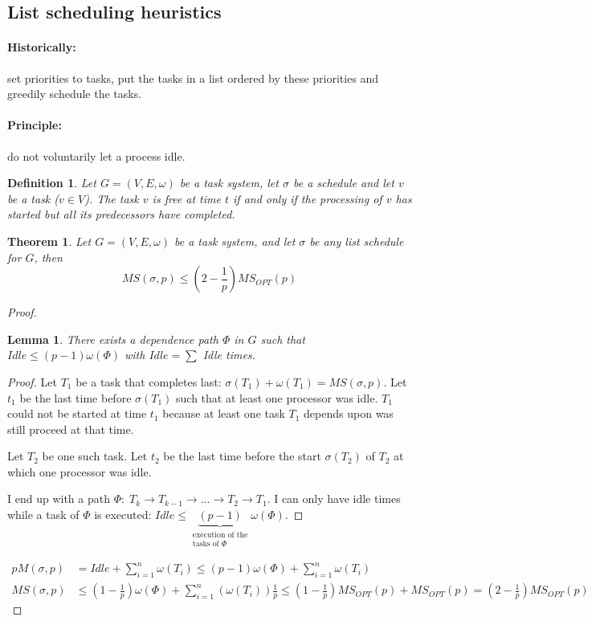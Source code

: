 \documentclass{article}
\newtheorem{thm}{Theorem}
\newtheorem{lemma}{Lemma}
\newtheorem{defi}{Definition}
\begin{document}
\subsection{List scheduling heuristics}
\paragraph{Historically:} set priorities to tasks, put the tasks in a list ordered by these priorities and greedily schedule the tasks.

\paragraph{Principle:} do not voluntarily let a process idle.

\begin{defi}
Let $G=(V,E,\omega)$ be a task system, let $\sigma$ be a schedule and let $v$ be a task ($v\in V$). The task $v$ is free at time $t$ if and only if the processing of $v$ has started but all its predecessors have completed.
\end{defi}

\begin{thm}
Let $G=(V,E,\omega)$ be a task system, and let $\sigma$ be any list schedule for $G$, then 
\[
\tag{Graham's bound}
MS(\sigma , p) \leq \left(2 - \frac{1}{p}\right) MS_{OPT}(p)
\]
\end{thm}

\begin{proof}

\begin{lemma}
There exists a dependence path $\Phi$ in $G$ such that $Idle \leq (p-1)\omega (\Phi )$ with $Idle=\sum $ Idle times.
\end{lemma}
\begin{proof}
Let $T_1$ be a task that completes last: $\sigma (T_1) + \omega (T_1) = MS(\sigma , p)$. Let $t_1$ be the last time before $\sigma (T_1)$ such that at least one processor was idle. $T_1$ could not be started at time $t_1$ because at least one task $T_1$ depends upon was still proceed at that time.

Let $T_2$ be one such task. Let $t_2$ be the last time before the start $\sigma ( T_2)$ of $T_2$ at which one processor was idle.

I end up with a path $\Phi : \; T_k \to T_{k-1} \to ... \to T_2 \to T_1$. I can only have idle times while a task of $\Phi$ is executed: $Idle \leq \underbrace{(p-1)}_{\substack{\text{execution of the}\\\text{tasks of $\Phi$}}}\omega (\Phi)$.
\end{proof}

\begin{align*}
pM(\sigma,p)& = Idle + \sum_{i=1}^n \omega (T_i) \leq (p-1) \omega ( \Phi ) + \sum_{i=1}^n \omega ( T_i )\\
MS(\sigma,p) & \leq \left(1-\frac{1}{p}\right) \omega (\Phi) + \sum_{i=1}^n (\omega (T_i))\frac{1}{p} \leq \left(1-\frac{1}{p}\right) MS_{OPT}(p) + MS_{OPT}(p) = \left(2-\frac{1}{p} \right) MS_{OPT}(p)
\end{align*}
\end{proof}
\end{document}
